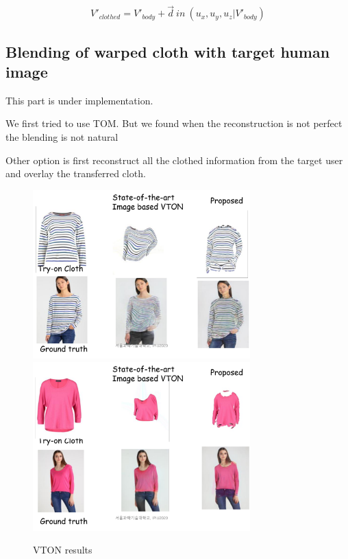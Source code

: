 \begin{equation}
 V'_{clothed} = V'_{body} + \overrightarrow{d} \: in \: (u_x, u_y, u_z | V'_{body})
\end{equation}



\subsection{Blending of warped cloth with target human image}


This part is under implementation.

We first tried to use TOM. But we found when the reconstruction is not perfect the blending is not natural 

Other option is first reconstruct all the clothed information from the target user and overlay the transferred cloth.


\begin{figure}
\centering
\includegraphics[height=6.5cm, scale=1]{figures/vton_result1.png} 
\includegraphics[height=6.5cm, scale=1]{figures/vton_result2.png} 
\caption{VTON results}
\label{fig:vtonresults}
\end{figure}




